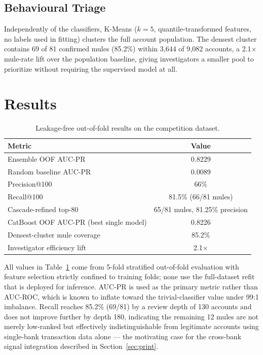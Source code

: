 \documentclass{article}
\begin{document}
\subsection{Behavioural Triage}
\label{ssec:triage}

Independently of the classifiers, K-Means ($k=5$, quantile-transformed features, no
labels used in fitting) clusters the full account population. The densest cluster
contains 69 of 81 confirmed mules (85.2\%) within 3{,}644 of 9{,}082 accounts, a
2.1$\times$ mule-rate lift over the population baseline, giving investigators a smaller
pool to prioritize without requiring the supervised model at all.

\section{Results}
\label{sec:illust}

\begin{table}[htb]
\centering
\begin{tabular}{lc}
\hline
\textbf{Metric} & \textbf{Value} \\
\hline
Ensemble OOF AUC-PR & 0.8229 \\
Random baseline AUC-PR & 0.0089 \\
Precision@100 & 66\% \\
Recall@100 & 81.5\% (66/81 mules) \\
Cascade-refined top-80 & 65/81 mules, 81.25\% precision \\
CatBoost OOF AUC-PR (best single model) & 0.8226 \\
Densest-cluster mule coverage & 85.2\% \\
Investigator efficiency lift & 2.1$\times$ \\
\hline
\end{tabular}
\caption{Leakage-free out-of-fold results on the competition dataset.}
\label{tab:results}
\end{table}

All values in Table~\ref{tab:results} come from 5-fold stratified out-of-fold
evaluation with feature selection strictly confined to training folds; none use the
full-dataset refit that is deployed for inference. AUC-PR is used as the primary
metric rather than AUC-ROC, which is known to inflate toward the trivial-classifier
value under 99:1 imbalance. Recall reaches 85.2\% (69/81) by a review depth of 130
accounts and does not improve further by depth 180, indicating the remaining 12 mules
are not merely low-ranked but effectively indistinguishable from legitimate accounts
using single-bank transaction data alone --- the motivating case for the cross-bank
signal integration described in Section~\ref{sec:print}.
\end{document}
